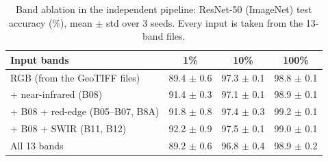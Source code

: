 \begin{table}[t]
\centering
\caption{Band ablation in the independent pipeline: ResNet-50 (ImageNet) test accuracy (\%), mean $\pm$ std over 3 seeds. Every input is taken from the 13-band files.}
\label{tab:band_ablation}
\small
\begin{tabular}{lccc}
\toprule
Input bands & 1\% & 10\% & 100\% \\
\midrule
RGB (from the GeoTIFF files) & 89.4 $\pm$ 0.6 & 97.3 $\pm$ 0.1 & 98.8 $\pm$ 0.1 \\
+ near-infrared (B08) & 91.4 $\pm$ 0.3 & 97.1 $\pm$ 0.1 & 98.9 $\pm$ 0.1 \\
+ B08 + red-edge (B05--B07, B8A) & 91.8 $\pm$ 0.8 & 97.4 $\pm$ 0.3 & 99.2 $\pm$ 0.1 \\
+ B08 + SWIR (B11, B12) & 92.2 $\pm$ 0.9 & 97.5 $\pm$ 0.1 & 99.0 $\pm$ 0.1 \\
All 13 bands & 89.2 $\pm$ 0.6 & 96.8 $\pm$ 0.4 & 98.9 $\pm$ 0.2 \\
\bottomrule
\end{tabular}
\end{table}
